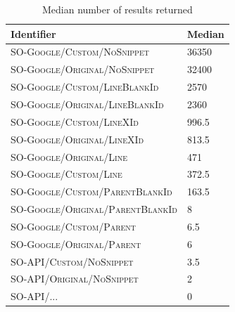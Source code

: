 \documentclass[preprint,12pt]{elsarticle}
\begin{document}
\renewcommand{\arraystretch}{1.2}
\begin{table}[h]
    \centering
    \caption{Median number of results returned}
    \label{table: number of results}
    \footnotesize
    \begin{tabular}{m{9.2cm}L{3.6cm}}
    \bottomrule
    \hline
    \textbf{Identifier} &  \textbf{Median} \\ \hline
    \textsc{SO-Google/Custom/NoSnippet} & 36350 \\ \hline
    \textsc{SO-Google/Original/NoSnippet}  & 32400\\ \hline
    \textsc{SO-Google/Custom/LineBlankId} & 2570 \\ \hline
    \textsc{SO-Google/Original/LineBlankId} & 2360\\ \hline
    \textsc{SO-Google/Custom/LineXId} & 996.5\\ \hline
    \textsc{SO-Google/Original/LineXId} & 813.5\\ \hline
    \textsc{SO-Google/Original/Line}  & 471 \\ \hline
    \textsc{SO-Google/Custom/Line} & 372.5 \\ \hline
    \textsc{SO-Google/Custom/ParentBlankId}  & 163.5\\ \hline
    \textsc{SO-Google/Original/ParentBlankId} & 8\\ \hline
    \textsc{SO-Google/Custom/Parent} & 6.5\\ \hline
    \textsc{SO-Google/Original/Parent} & 6 \\ \hline \hline
    \textsc{SO-API/Custom/NoSnippet} & 3.5 \\ \hline
    \textsc{SO-API/Original/NoSnippet}  & 2\\ \hline
    \textsc{SO-API/...} & 0 \\ \bottomrule\hline
    \end{tabular}
\end{table}
\end{document}
